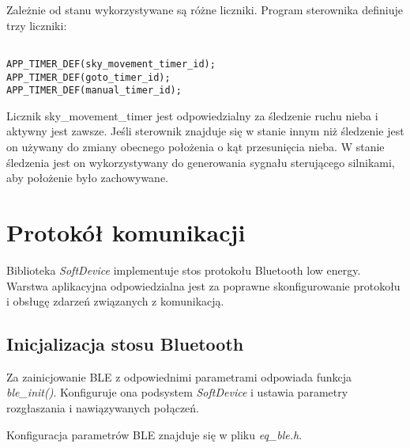 Zależnie od stanu wykorzystywane są różne liczniki. Program sterownika definiuje
trzy liczniki:

\begin{lstlisting}

APP_TIMER_DEF(sky_movement_timer_id);
APP_TIMER_DEF(goto_timer_id);
APP_TIMER_DEF(manual_timer_id);

\end{lstlisting}

Licznik sky\_movement\_timer jest odpowiedzialny za śledzenie ruchu nieba
i aktywny jest zawsze. Jeśli sterownik znajduje się w stanie innym niż śledzenie
jest on używany do zmiany obecnego położenia o kąt przesunięcia nieba. W stanie
śledzenia jest on wykorzystywany do generowania sygnału sterującego silnikami,
aby położenie było zachowywane.








\section{Protokół komunikacji}

Biblioteka \emph{SoftDevice} implementuje stos protokołu Bluetooth low energy.
Warstwa aplikacyjna odpowiedzialna jest za poprawne skonfigurowanie protokołu
i obsługę zdarzeń związanych z komunikacją.

\subsection{Inicjalizacja stosu Bluetooth}

Za zainicjowanie BLE z odpowiednimi parametrami odpowiada funkcja
\emph{ble\_init()}. Konfiguruje ona podsystem \emph{SoftDevice} i ustawia
parametry rozgłaszania i nawiązywanych połączeń.

Konfiguracja parametrów BLE znajduje się w pliku \emph{eq\_ble.h}.

